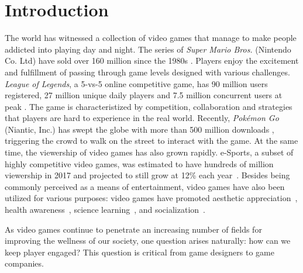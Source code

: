 
\chapter{Introduction} %

\label{chapter:intro} %

The world has witnessed a collection of video games that manage to make people addicted into playing day and night. The series of \textit{Super Mario Bros.} (Nintendo Co. Ltd) have sold over 160 million since the 1980s \cite{mariosale}. Players enjoy the excitement and fulfillment of passing through game levels designed with various challenges. \textit{League of Legends}, a 5-vs-5 online competitive game, has 90 million users registered, 27 million unique daily players and 7.5 million concurrent users at peak \cite{lol_fanbase,lol_27million}. The game is characteristized by competition, collaboration and strategies that players are hard to experience in the real world. Recently, \textit{Pok\'{e}mon Go} (Niantic, Inc.) has swept the globe with more than 500 million downloads \cite{pokemongo}, triggering the crowd to walk on the street to interact with the game. At the same time, the viewership of video games has also grown rapidly. e-Sports, a subset of highly competitive video games, was estimated to have hundreds of million viewership in 2017 and projected to still grow at 12\% each year~\cite{superdata2017}. Besides being commonly perceived as a means of entertainment, video games have also been utilized for various purposes: video games have promoted aesthetic appreciation~\cite{jarvinen2008understanding}, health awareness~\cite{shiyko2016effects}, science learning~\cite{cooper2013increasing}, and socialization~\cite{ferguson2013friends}.

As video games continue to penetrate an increasing number of fields for improving the wellness of our society, one question arises naturally: how can we keep player engaged? This question is critical from game designers to game companies.

